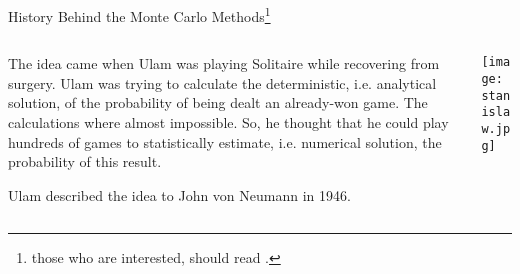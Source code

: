 
\begin{frame}{History Behind the Monte Carlo Methods\footnote{those who are interested, should read \textcite{eckhardtStanUlamJohn1987}.}}
	\begin{columns}
		\begin{column}{0.8\textwidth}
			\begin{vfilleditems}
				\item The idea came when Ulam was playing Solitaire while recovering from surgery.
				Ulam was trying to calculate the deterministic, i.e. analytical solution,
				of the probability of being dealt an already-won game.
				The calculations where almost impossible.
				So, he thought that he could play hundreds of games to statistically estimate,
				i.e. numerical solution, the probability of this result.
				\item Ulam described the idea to John von Neumann in 1946.
			\end{vfilleditems}
		\end{column}
		\begin{column}{0.2\textwidth}
			\centering
			\texttt{[image: stanislaw.jpg]}
		\end{column}
	\end{columns}
\end{frame}

